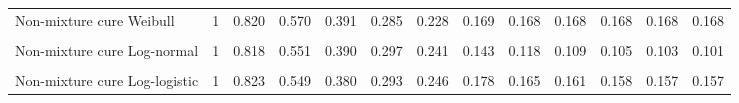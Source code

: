 \documentclass[
]{article}
\begin{document}
\begin{table}[H]
{\begin{tabular}[t]{lrrrrrrrrrrrr}
Non-mixture cure Weibull & 1 & 0.820 & 0.570 & 0.391 & 0.285 & 0.228 & 0.169 & 0.168 & 0.168 & 0.168 & 0.168 & 0.168\\
\cellcolor{gray!10}{Mixture cure Log-normal} & \cellcolor{gray!10}{1} & \cellcolor{gray!10}{0.818} & \cellcolor{gray!10}{0.558} & \cellcolor{gray!10}{0.394} & \cellcolor{gray!10}{0.295} & \cellcolor{gray!10}{0.235} & \cellcolor{gray!10}{0.134} & \cellcolor{gray!10}{0.116} & \cellcolor{gray!10}{0.111} & \cellcolor{gray!10}{0.109} & \cellcolor{gray!10}{0.108} & \cellcolor{gray!10}{0.108}\\
Non-mixture cure Log-normal & 1 & 0.818 & 0.551 & 0.390 & 0.297 & 0.241 & 0.143 & 0.118 & 0.109 & 0.105 & 0.103 & 0.101\\
\cellcolor{gray!10}{Mixture cure Log-logistic} & \cellcolor{gray!10}{1} & \cellcolor{gray!10}{0.822} & \cellcolor{gray!10}{0.549} & \cellcolor{gray!10}{0.381} & \cellcolor{gray!10}{0.290} & \cellcolor{gray!10}{0.240} & \cellcolor{gray!10}{0.163} & \cellcolor{gray!10}{0.148} & \cellcolor{gray!10}{0.143} & \cellcolor{gray!10}{0.140} & \cellcolor{gray!10}{0.139} & \cellcolor{gray!10}{0.138}\\
Non-mixture cure Log-logistic & 1 & 0.823 & 0.549 & 0.380 & 0.293 & 0.246 & 0.178 & 0.165 & 0.161 & 0.158 & 0.157 & 0.157\\
\bottomrule
\end{tabular}}
\end{table}
\end{document}
